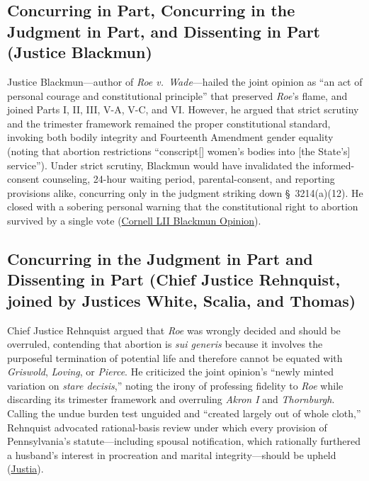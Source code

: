 \documentclass[12pt]{article}
\begin{document}
\subsection{Concurring in Part, Concurring in the Judgment in Part, and Dissenting in Part (Justice Blackmun)}

Justice Blackmun---author of \textit{Roe v.\ Wade}---hailed the joint opinion as ``an act of personal courage and constitutional principle'' that preserved \textit{Roe}'s flame, and joined Parts I, II, III, V-A, V-C, and VI. However, he argued that strict scrutiny and the trimester framework remained the proper constitutional standard, invoking both bodily integrity and Fourteenth Amendment gender equality (noting that abortion restrictions ``conscript[] women's bodies into [the State's] service''). Under strict scrutiny, Blackmun would have invalidated the informed-consent counseling, 24-hour waiting period, parental-consent, and reporting provisions alike, concurring only in the judgment striking down \S\ 3214(a)(12). He closed with a sobering personal warning that the constitutional right to abortion survived by a single vote (\href{https://www.law.cornell.edu/supct/html/91-744.ZX2.html}{Cornell LII Blackmun Opinion}).

\subsection{Concurring in the Judgment in Part and Dissenting in Part (Chief Justice Rehnquist, joined by Justices White, Scalia, and Thomas)}

Chief Justice Rehnquist argued that \textit{Roe} was wrongly decided and should be overruled, contending that abortion is \textit{sui generis} because it involves the purposeful termination of potential life and therefore cannot be equated with \textit{Griswold}, \textit{Loving}, or \textit{Pierce}. He criticized the joint opinion's ``newly minted variation on \textit{stare decisis},'' noting the irony of professing fidelity to \textit{Roe} while discarding its trimester framework and overruling \textit{Akron I} and \textit{Thornburgh}. Calling the undue burden test unguided and ``created largely out of whole cloth,'' Rehnquist advocated rational-basis review under which every provision of Pennsylvania's statute---including spousal notification, which rationally furthered a husband's interest in procreation and marital integrity---should be upheld (\href{https://supreme.justia.com/cases/federal/us/505/833/}{Justia}).
\end{document}
